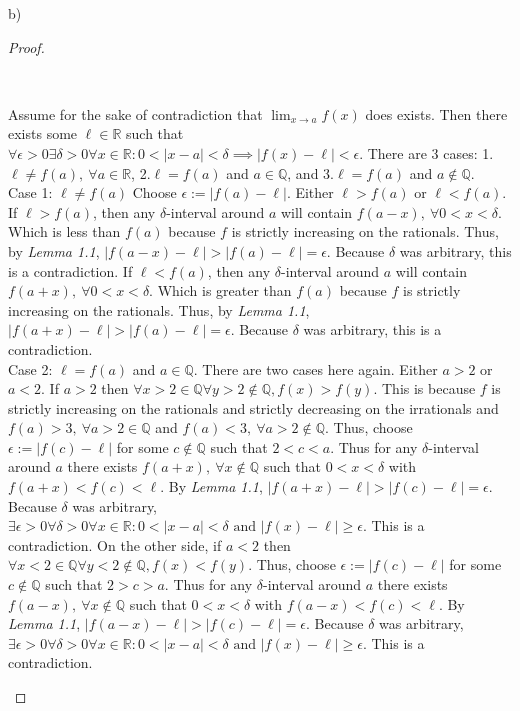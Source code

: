 \documentclass[11pt]{article}
\newcommand{\R}{\mathbb{R}}
\newenvironment{myproof}
{\begin{proof} \begin{adjustwidth}{3em}{0pt}$ $\par\nobreak\ignorespaces}
{\end{adjustwidth} \end{proof}}
\begin{document}
\begin{flushleft}
b)
\begin{myproof}
Assume for the sake of contradiction that $\lim_{x\to a}f(x)$ does exists. Then there exists some $\ell \in \R$ such that $\forall \epsilon > 0 \exists \delta > 0 \forall x \in \R: 0 < |x-a| < \delta \implies |f(x)-\ell| < \epsilon$. There are 3 cases: 1.$\ell \neq f(a), \ \forall a \in \R$, 2.$\ell = f(a)$ and $a \in \mathbb{Q}$, and 3.$\ell = f(a)$ and $a \notin \mathbb{Q}$.\\
\bigskip
Case 1: $\ell \neq f(a)$ Choose $\epsilon := |f(a) - \ell|$. Either $\ell > f(a)$ or $\ell < f(a)$. If $\ell > f(a)$, then any $\delta$-interval around $a$ will contain $f(a-x), \ \forall 0 < x < \delta$. Which is less than $f(a)$ because $f$ is strictly increasing on the rationals. Thus, by \textit{Lemma 1.1}, $|f(a -x) - \ell| > |f(a) - \ell| = \epsilon$. Because $\delta$ was arbitrary, this is a contradiction. If $\ell < f(a)$, then any $\delta$-interval around $a$ will contain $f(a+x), \ \forall 0<x< \delta$. Which is greater than $f(a)$ because $f$ is strictly increasing on the rationals. Thus, by \textit{Lemma 1.1}, $|f(a+x) -\ell| > |f(a) - \ell| = \epsilon$. Because $\delta$ was arbitrary, this is a contradiction. \\
\bigskip
Case 2: $\ell = f(a)$ and $a \in \mathbb{Q}$. There are two cases here again. Either $a > 2$ or $a<2$. If $a > 2$ then $\forall x > 2 \in \mathbb{Q} \forall y > 2 \notin \mathbb{Q}, f(x)>f(y)$. This is because $f$ is strictly increasing on the rationals and strictly decreasing on the irrationals and $f(a) > 3, \ \forall a > 2 \in \mathbb{Q}$ and $f(a) < 3, \ \forall a > 2 \notin \mathbb{Q}$. Thus, choose $\epsilon:= |f(c)-\ell|$ for some $c \notin \mathbb{Q}$ such that $2 < c < a$. Thus for any $\delta$-interval around $a$ there exists $f(a+x), \ \forall x \notin \mathbb{Q}$ such that $0<x<\delta$ with $f(a+x) < f(c) < \ell$. By \textit{Lemma 1.1}, $|f(a+x) - \ell| > |f(c) - \ell| = \epsilon$. Because $\delta$ was arbitrary, $\exists \epsilon > 0 \forall \delta > 0 \forall x \in \R: 0<|x-a|< \delta \text{ and } |f(x) - \ell| \geq \epsilon$. This is a contradiction. On the other side, if $a < 2$ then $\forall x < 2 \in \mathbb{Q} \forall y < 2 \notin \mathbb{Q}, f(x)<f(y)$. Thus, choose $\epsilon:= |f(c)-\ell|$ for some $c \notin \mathbb{Q}$ such that $2 > c > a$. Thus for any $\delta$-interval around $a$ there exists $f(a-x), \ \forall x \notin \mathbb{Q}$ such that $0<x<\delta$ with $f(a-x) < f(c) < \ell$. By \textit{Lemma 1.1}, $|f(a-x) - \ell| > |f(c) - \ell| = \epsilon$. Because $\delta$ was arbitrary, $\exists \epsilon > 0 \forall \delta > 0 \forall x \in \R: 0<|x-a|< \delta \text{ and } |f(x) - \ell| \geq \epsilon$. This is a contradiction.\\

\end{myproof}
\end{flushleft}
\end{document}
